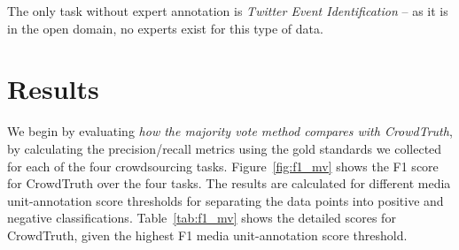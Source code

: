 The only task without expert annotation is \textit{Twitter Event Identification} -- as it is in the open domain, no experts exist for this type of data.

\section{Results}
\label{sec:results}

We begin by evaluating \textit{how the majority vote method compares with CrowdTruth}, by calculating the precision/recall metrics using the gold standards we collected for each of the four crowdsourcing tasks.  Figure~\ref{fig:f1_mv} shows the F1 score for CrowdTruth over the four tasks.  The results are calculated for different media unit-annotation score thresholds for separating the data points into positive and negative classifications.  Table~\ref{tab:f1_mv} shows the detailed scores for CrowdTruth, given the highest F1 media unit-annotation score threshold.

